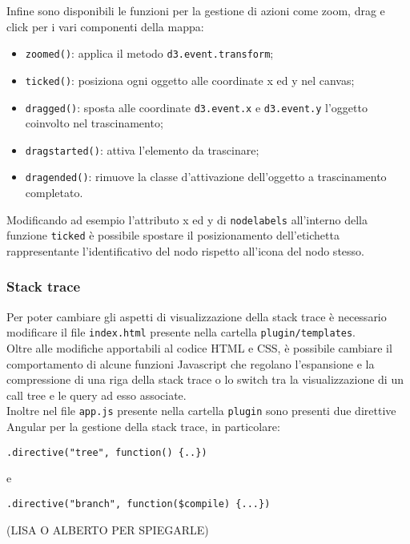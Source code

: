 Infine sono disponibili le funzioni per la gestione di azioni come zoom, drag e click per i vari componenti della mappa:
\begin{itemize}
	\item \texttt{zoomed()}: applica il metodo \texttt{d3.event.transform};
	\item \texttt{ticked()}: posiziona ogni oggetto alle coordinate x ed y nel canvas;
	\item \texttt{dragged()}: sposta alle coordinate \texttt{d3.event.x} e \texttt{d3.event.y} l'oggetto coinvolto nel trascinamento;
	\item \texttt{dragstarted()}: attiva l'elemento da trascinare;
	\item \texttt{dragended()}: rimuove la classe d'attivazione dell'oggetto a trascinamento completato.
\end{itemize}
Modificando ad esempio l'attributo x ed y di \texttt{nodelabels} all'interno della funzione \texttt{ticked} è possibile spostare il posizionamento dell'etichetta rappresentante l'identificativo del nodo rispetto all'icona del nodo stesso.\\

\subsubsection{Stack trace}
\label{sec:stack}
Per poter cambiare gli aspetti di visualizzazione della stack trace è necessario modificare il file \texttt{index.html} presente nella cartella \texttt{plugin/templates}.\\
Oltre alle modifiche apportabili al codice HTML e CSS, è possibile cambiare il comportamento di alcune funzioni Javascript che regolano l'espansione e la compressione di una riga della stack trace o lo switch tra la visualizzazione di un call tree e le query ad esso associate.\\
Inoltre nel file \texttt{app.js} presente nella cartella \texttt{plugin} sono presenti due direttive Angular per la gestione della stack trace, in particolare:
\begin{lstlisting}
.directive("tree", function() {..})
\end{lstlisting}
e
\begin{lstlisting}
.directive("branch", function($compile) {...})
\end{lstlisting}
(LISA O ALBERTO PER SPIEGARLE)
